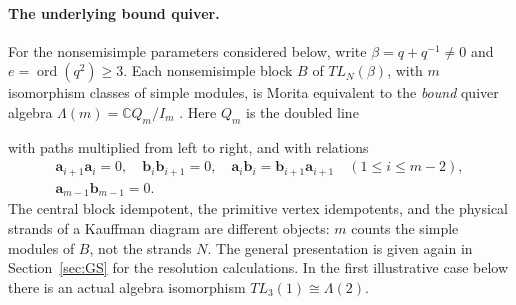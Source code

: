\documentclass[a4paper,11pt,oneside,reqno]{amsart}
\theoremstyle{definition}
\numberwithin{equation}{section}
\begin{document}
\paragraph{The underlying bound quiver.}
For the nonsemisimple parameters considered below, write
$\beta=q+q^{-1}\ne0$ and $e=\operatorname{ord}(q^2)\ge3$.
Each nonsemisimple block $B$ of $TL_N(\beta)$, with $m$ isomorphism
classes of simple modules, is Morita equivalent to the \emph{bound}
quiver algebra $\Lambda(m)=\mathbb C Q_m/I_m$ \cite{Westbury,RSA}.
Here $Q_m$ is the doubled line
\begin{center}
\end{center}
with paths multiplied from left to right, and with relations
\begin{equation}\label{intro:quiver-relations}
\begin{gathered}
 \mathbf a_{i+1}\mathbf a_i=0,\quad
 \mathbf b_i\mathbf b_{i+1}=0,\quad
 \mathbf a_i\mathbf b_i=\mathbf b_{i+1}\mathbf a_{i+1}
 \quad(1\le i\le m-2),\\
 \mathbf a_{m-1}\mathbf b_{m-1}=0.
\end{gathered}
\end{equation}
The central block idempotent, the primitive vertex idempotents,
and the physical strands of a Kauffman diagram are different objects:
$m$ counts the simple modules of $B$, not the strands $N$.
The general presentation is given again in Section~\ref{sec:GS}
for the resolution calculations. In the first illustrative case below
there is an actual algebra isomorphism $TL_3(1)\cong\Lambda(2)$.
\end{document}

